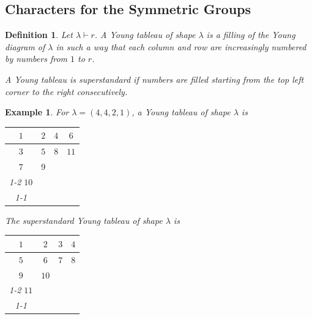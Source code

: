 \documentclass{article}
\newtheorem{definition}{Definition}[section]
\newtheorem{example}{Example}[section]
\numberwithin{equation}{theorem}
\begin{document}
\subsection{Characters for the Symmetric Groups}
\begin{definition}
    Let $\lambda\vdash r$. A Young tableau of shape $\lambda$ is a filling of the Young diagram of $\lambda$ in such a way that each column and row are increasingly numbered by numbers from $1$ to $r$.
    \par A Young tableau is superstandard if numbers are filled starting from the top left corner to the right consecutively. 
\end{definition}
\begin{example}
  For $\lambda=(4,4,2,1)$, a Young tableau of shape $\lambda$ is 
  \begin{center}
\begin{tabular}{|c|ccc}
\hline
$1$  & \multicolumn{1}{c|}{$2$} & \multicolumn{1}{c|}{$4$} & \multicolumn{1}{c|}{$6$}  \\ \hline
$3$  & \multicolumn{1}{c|}{$5$} & \multicolumn{1}{c|}{$8$} & \multicolumn{1}{c|}{$11$} \\ \hline
$7$  & \multicolumn{1}{c|}{$9$} &                          &                           \\ \cline{1-2}
$10$ &                          &                          &                           \\ \cline{1-1}
\end{tabular}
  \end{center}
  The superstandard Young tableau of shape $\lambda$ is 
    \begin{center}
\begin{tabular}{|c|ccc}
\hline
$1$  & \multicolumn{1}{c|}{$2$} & \multicolumn{1}{c|}{$3$} & \multicolumn{1}{c|}{$4$}  \\ \hline
$5$  & \multicolumn{1}{c|}{$6$} & \multicolumn{1}{c|}{$7$} & \multicolumn{1}{c|}{$8$} \\ \hline
$9$  & \multicolumn{1}{c|}{$10$} &                          &                           \\ \cline{1-2}
$11$ &                          &                          &                           \\ \cline{1-1}
\end{tabular}
  \end{center}
\end{example}
\end{document}

